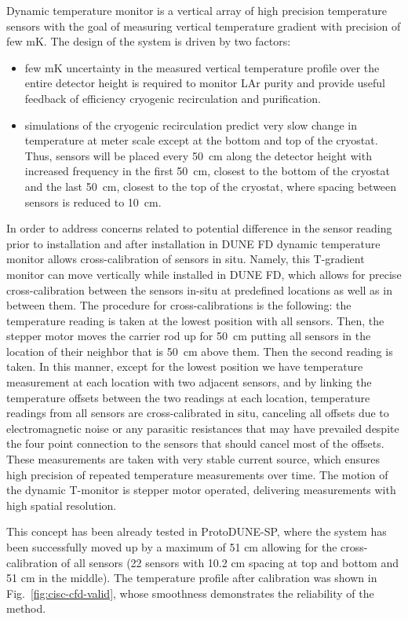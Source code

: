 Dynamic temperature monitor is a vertical array of high precision temperature sensors with the goal of measuring vertical temperature gradient with precision of few mK. The design of the system is driven by two factors:
\begin{itemize}
\item
few mK uncertainty in the measured vertical temperature profile over the entire detector height is required to monitor LAr purity and provide useful feedback of efficiency cryogenic recirculation and purification.
\item
simulations of the cryogenic recirculation predict very slow change in temperature at meter scale except at the bottom and top of the cryostat. Thus, sensors will be placed every \SI{50}{cm} along the detector height with increased frequency in the first \SI{50}{cm}, closest to the bottom of the cryostat and the last \SI{50}{cm}, closest to the top of the cryostat, where spacing between sensors is reduced to \SI{10}{cm}.
 \end{itemize}


 In order to address concerns related to potential difference in the sensor reading prior to installation and after installation in DUNE FD dynamic temperature monitor allows cross-calibration of sensors in situ. Namely, this T-gradient monitor  can move vertically while installed in DUNE FD, which allows for precise cross-calibration between the sensors in-situ at predefined locations as well as in between them. The procedure for cross-calibrations is the following: the temperature reading is taken at the lowest position with all sensors. Then, the stepper motor moves the carrier rod up for \SI{50}{cm} putting all sensors in the location of their neighbor that is \SI{50}{cm} above them. Then the second reading is taken. In this manner, except for the lowest position we have temperature measurement at each location with two adjacent sensors, and by linking the temperature offsets between the two readings at each location, temperature readings from all sensors are cross-calibrated in situ, canceling all offsets due to electromagnetic noise or any parasitic resistances that may have prevailed despite the four point connection to the sensors that should cancel most of the offsets. These measurements are taken with very stable current source, which ensures high precision of repeated temperature measurements over time. The motion of the dynamic T-monitor is stepper motor operated, delivering measurements with high spatial resolution. 

This concept has been already tested in ProtoDUNE-SP, where the system has been successfully moved up by a maximum of 51 cm allowing for the cross-calibration of all sensors (22 sensors with 10.2 cm spacing at top and bottom and 51 cm in the middle). 
The temperature profile after calibration was shown in Fig.~\ref{fig:cisc-cfd-valid}, whose smoothness demonstrates the reliability of the method.  

